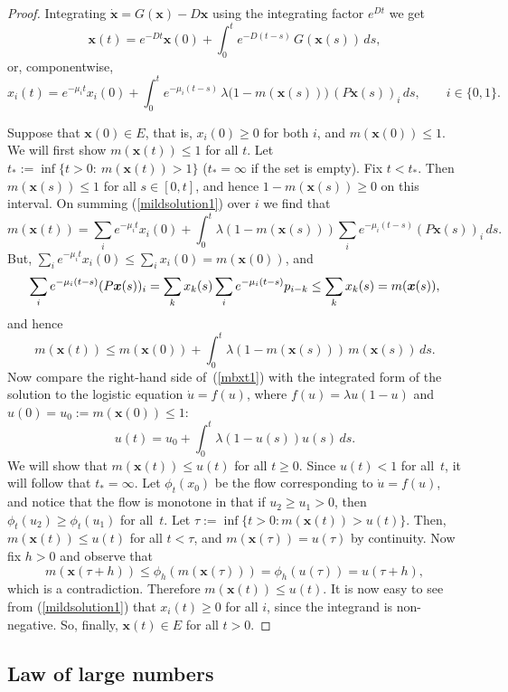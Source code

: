 \documentclass[12pt]{article}
\newcommand{\bx}{\boldsymbol{x}}
\begin{document}
\begin{proof}
Integrating $\dot{\bx}=G(\bx) - D\bx$ using the integrating factor
$e^{Dt}$ we get
$$
\bx(t)=e^{-D t}\bx(0)+\int_0^t e^{-D(t-s)}\,G(\bx(s))\,ds,
$$
or, componentwise,
\begin{equation}
x_i(t)=e^{-\mu_i t}x_i(0)+\int_0^t
e^{-\mu_i(t-s)}\,\lambda\bigl(1-m(\bx(s))\bigr)\, (P\bx(s))_i\,ds,
\qquad i\in \{0,1\}.
\label{mildsolution1}
\end{equation}

Suppose that $\bx(0)\in E$, that is, 
$x_i(0)\geq 0$ for both $i$, and $m(\bx(0))\leq 1$.
We will first show $m(\bx(t))\leq 1$ for all $t$.
Let $t_*:=\inf\{t>0:\ m(\bx(t))>1\}$ 
($t_*=\infty$ if the set is empty).
Fix $t<t_*$. Then $m(\bx(s))\le 1$ for all $s\in[0,t]$, and hence 
$1-m(\bx(s))\geq 0$ on this interval. 
On summing (\ref{mildsolution1}) over $i$ we find that 
\[
m(\bx(t))=\sum_i e^{-\mu_i t}x_i(0)
+\int_0^t \lambda(1-m(\bx(s)))\sum_i e^{-\mu_i(t-s)}(P\bx(s))_i\,ds.
\]
But, $\sum_i e^{-\mu_i t}x_i(0)\le \sum_i x_i(0)=m(\bx(0))$, and
$$
\sum_i e^{-\mu_i(t-s)}(P\bx(s))_i
=\sum_k x_k(s)\sum_i e^{-\mu_i(t-s)}p_{i-k}\\
\leq \sum_k x_k(s)=m(\bx(s)),
$$
and hence 
\begin{equation}
m(\bx(t))\le m(\bx(0))+\int_0^t \lambda(1-m(\bx(s)))\,m(\bx(s))\,ds.
\label{mbxt1}
\end{equation}
Now compare the right-hand side of~(\ref{mbxt1}) with the
integrated form of the solution to the
logistic equation $\dot{u}=f(u)$, where $f(u)=\lambda u(1-u)$ and 
$u(0)=u_0:=m(\bx(0))\le 1$:
$$
u(t) = u_0 + \int_0^t \lambda (1-u(s)) u(s)\, ds.
$$
We will show that $m(\bx(t))\leq u(t)$ for all $t\geq 0$. 
Since $u(t)<1$ for all~$t$, it will follow that $t_*=\infty$. 
Let $\phi_t(x_0)$ be the flow corresponding to $\dot{u}=f(u)$,
and notice that the flow is monotone in that if $u_2\geq u_1>0$,
then $\phi_t(u_2)\geq \phi_t(u_1)$ for all~$t$.
Let $\tau := \inf\{t>0 : m(\bx(t)) > u(t)\}$.
Then, $m(\bx(t))\leq u(t)$ for all $t<\tau$, and $m(\bx(\tau))=u(\tau)$
by continuity. Now fix $h>0$ and observe that
$$
m(\bx(\tau+h)) \leq \phi_h(m(\bx(\tau)))=\phi_h(u(\tau))= u(\tau+h),
$$
which is a contradiction. Therefore $m(\bx(t))\leq u(t)$.
It is now easy to see from (\ref{mildsolution1}) that $x_i(t)\geq 0$
for all $i$, since the integrand is non-negative.
So, finally, $\bx(t)\in E$ for all $t>0$.
\end{proof}

\subsection{Law of large numbers}
\label{appendix2}
\end{document}
